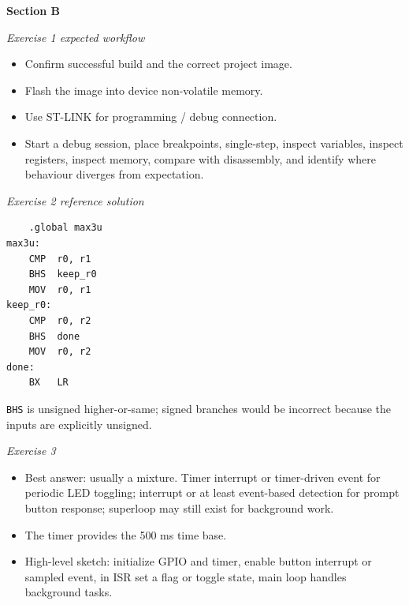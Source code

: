 \documentclass[11pt,a4paper]{article}
\begin{document}
\textbf{Section B}

\textit{Exercise 1 expected workflow}
\begin{itemize}[leftmargin=1.5em]
\item Confirm successful build and the correct project image.
\item Flash the image into device non-volatile memory.
\item Use ST-LINK for programming / debug connection.
\item Start a debug session, place breakpoints, single-step, inspect variables, inspect registers, inspect memory, compare with disassembly, and identify where behaviour diverges from expectation.
\end{itemize}

\textit{Exercise 2 reference solution}
\begin{verbatim}
    .global max3u
max3u:
    CMP  r0, r1
    BHS  keep_r0
    MOV  r0, r1
keep_r0:
    CMP  r0, r2
    BHS  done
    MOV  r0, r2
done:
    BX   LR
\end{verbatim}
\texttt{BHS} is unsigned higher-or-same; signed branches would be incorrect because the inputs are explicitly unsigned.

\textit{Exercise 3}
\begin{itemize}[leftmargin=1.5em]
\item Best answer: usually a mixture. Timer interrupt or timer-driven event for periodic LED toggling; interrupt or at least event-based detection for prompt button response; superloop may still exist for background work.
\item The timer provides the 500 ms time base.
\item High-level sketch: initialize GPIO and timer, enable button interrupt or sampled event, in ISR set a flag or toggle state, main loop handles background tasks.
\end{itemize}
\end{document}
